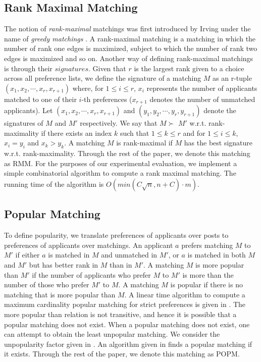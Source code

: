 \documentclass[letterpaper]{article} %
\begin{document}
\subsection{Rank Maximal Matching}
The notion of \textit{rank-maximal} matchings was first introduced by
Irving under the name of \textit{greedy matchings} \cite{irving2003greedy}.
A rank-maximal matching is a matching in which the number of rank one edges is maximized, subject to which the number of rank two edges is maximized and so on.
Another way of defining rank-maximal matchings is through their $signatures$.
Given that $r$ is the largest rank given to a choice across all preference lists, we define the signature of a matching $M$ as an
r-tuple $(x_{1},x_{2},\cdots ,x_{r}, x_{r+1})$ where, for $1 \leq i \leq r$, $x_{i}$ represents the number of applicants matched
to one of their $i$-th preferences ($x_{r+1}$ denotes the number of unmatched applicants). Let $(x_1, x_2,\cdots, x_r, x_{r+1})$ and $(y_1, y_2,\cdots, y_r, y_{r+1})$ denote
the signatures of $M$ and $M'$ respectively. We say that $M \succ$ $M'$ w.r.t. rank-maximality if there exists an index $k$ such that
$1 \le k \le r$ and
for $1 \le i \le k$, $x_i = y_i$ and $x_k > y_k$. A matching $M$ is rank-maximal if $M$ has the best signature
w.r.t. rank-maximality. %
Through the rest of the paper, we denote this matching as RMM.
For the purposes of our experimental evaluation, we implement a simple combinatorial algorithm \cite{irving2004rank} to compute
a rank maximal matching. The running time of the algorithm is  $O(min(C\sqrt{n}, n+C)\cdot m)$. %
\subsection{Popular Matching}
To define popularity, we translate preferences of applicants over posts to preferences of applicants over matchings.
An applicant $a$ prefers matching $M$ to $M'$ if either $a$ is matched in $M$ and unmatched in $M'$, or $a$ is matched in both $M$ and $M'$ but has better rank in $M$ than in $M'$. A matching $M$ is more popular than $M'$ if the number of applicants
who prefer $M$ to $M'$ is more than the number of those who prefer $M'$ to $M$. A matching $M$ is popular if there is no matching that is more popular than $M$.
A linear time  algorithm to compute a maximum cardinality popular matching for strict preferences is given in \cite{pop-main}.
The more popular than relation is not transitive, and hence it is possible that a popular matching does not exist.  When a popular matching does not exist, one can attempt to obtain the  least unpopular matching. We consider the unpopularity factor given in \cite{unpop}.
An algorithm given in \cite{pop-bounded} finds a popular matching if it exists. %
Through the rest of the paper, we denote this matching as POPM.
\end{document}
